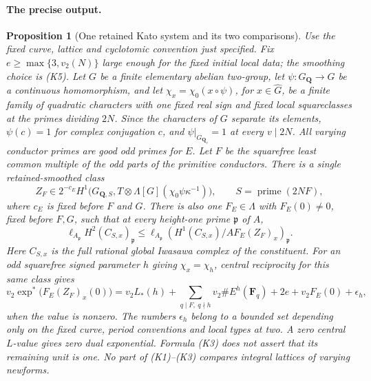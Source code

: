 \documentclass[11pt]{article}
\newtheorem{proposition}[theorem]{Proposition}
\theoremstyle{definition}
\theoremstyle{remark}
\begin{document}
\paragraph{The precise output.}
\begin{proposition}[One retained Kato system and its two comparisons]
\label{ex:app-kato-system}
Use the fixed curve, lattice and cyclotomic convention just specified.
Fix $e\ge\max\{3,v_2(N)\}$ large enough for the fixed initial local data;
the smoothing choice is (K5).
Let $G$ be a finite elementary abelian two-group, let
$\psi:G_{\mathbf Q}\to G$ be a continuous homomorphism, and let
$\chi_x=\chi_0(x\circ\psi)$, for $x\in\widehat G$, be a finite
family of quadratic characters with one fixed real sign and fixed
local squareclasses at the primes dividing $2N$.
Since the characters of $G$ separate
its elements, $\psi(c)=1$ for complex conjugation $c$, and
$\psi|_{G_{\mathbf Q_v}}=1$ at every $v\mid2N$. All varying conductor primes
are good odd primes for $E$. Let $F$ be the squarefree least common
multiple of the odd parts of the primitive conductors. There is a
single retained-smoothed class
\[
 Z_F\in 2^{-c_E}H^1\bigl(G_{\mathbf Q,S},
        T\otimes\Lambda[G](\chi_0\psi\kappa^{-1})\bigr),
 \qquad S=\operatorname{prime}(2NF),                         \tag{K1}
\]
where $c_E$ is fixed before $F$ and $G$.
There is also one $F_E\in\Lambda$ with $F_E(0)\ne0$, fixed before
$F,G$, such that at every height-one prime $\mathfrak p$ of $A$,
\[
 \ell_{A_{\mathfrak p}}H^2(C_{S,x})_{\mathfrak p}
 \leq
 \ell_{A_{\mathfrak p}}
 \left(H^1(C_{S,x})/A F_E(Z_F)_x\right)_{\mathfrak p}.       \tag{K2}
\]
Here $C_{S,x}$ is the full rational global Iwasawa complex of the
constituent. For an odd squarefree signed parameter $h$ giving
$\chi_x=\chi_h$, central reciprocity for this same class gives
\[
 v_2\exp^*\bigl(F_E(Z_F)_x(0)\bigr)
 =v_2L_*(h)+\sum_{q\mid F,\ q\nmid h}
        v_2\#E^h(\mathbf F_q)+2e+v_2F_E(0)+\epsilon_h,       \tag{K3}
\]
when the value is nonzero. The numbers $\epsilon_h$ belong to a
bounded set depending only on the fixed curve, period conventions
and local types at two. A zero central $L$-value gives zero dual
exponential. Formula (K3) does not assert that its remaining unit is
one. No part of (K1)--(K3) compares integral lattices of varying newforms.
\end{proposition}
\end{document}
